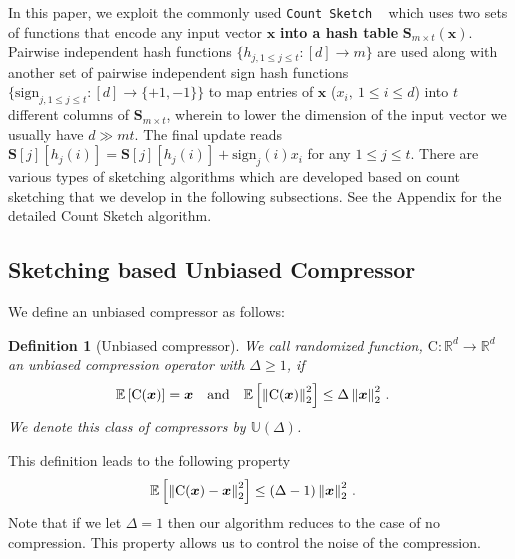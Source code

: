 \documentclass{article} %
\newtheorem{definition}{Definition}
\begin{document}
In this paper, we exploit the commonly used \texttt{Count Sketch} ~\citep{DBLP:journals/tcs/CharikarCF04} which uses two sets of functions that encode any input vector $\boldsymbol{x}$ \textbf{into a hash table} $\boldsymbol{S}_{m\times t}(\boldsymbol{x})$. 
Pairwise independent hash functions $\{h_{j,1\leq j\leq t }:[d]\rightarrow m\}$ are used along with another set of pairwise independent sign hash functions $\{\text{sign}_{j,1\leq j\leq t}: [d]\rightarrow \{+1,-1\}\}$ to map entries of $\boldsymbol{x}$ (${x}_i, \:1\leq i\leq d$) into $t$ different columns of $\mathbf{S}_{m\times t}$, wherein to lower the dimension of the input vector we usually have $d\gg mt$.  
The final update reads $\mathbf{S}[j][h_j(i)]=\mathbf{S}[j][h_{j}(i)]+\text{sign}_j(i){x}_i$ for any $1 \leq j \leq t$. There are various types of sketching algorithms which are developed based on count sketching that we develop in the following subsections. 
See the Appendix for the detailed Count Sketch algorithm. 




\vspace{-0.05in}
\subsection{Sketching based Unbiased Compressor}
\vspace{-0.05in}



We define an unbiased compressor as follows:
\begin{definition}[Unbiased compressor]\label{def:unbiased}
We call randomized function, $\text{C}:\mathbb{R}^{d}\rightarrow\mathbb{R}^{d}$ an unbiased compression operator with $\Delta\geq 1$, if
\begin{align}\notag
\mathbb{E}\left[\text{C}(\boldsymbol{x})\right]&=\boldsymbol{x}\nonumber \quad \textrm{and} \quad    \mathbb{E}\left[\left\|\text{C}(\boldsymbol{x})\right\|^2_2\right] \leq \Delta\left\|\boldsymbol{x}\right\|^2_2\notag \, .
\end{align}
We denote this class of compressors by $\mathbb{U}(\Delta)$.
\end{definition}
This definition leads to the following property 
\begin{align}\notag
    \mathbb{E}\left[\left\|\text{C}(\boldsymbol{x})-\boldsymbol{x}\right\|^2_2\right]&\leq \left(\Delta-1\right)\left\|\boldsymbol{x}\right\|^2_2\, .
\end{align}
Note that if we let $\Delta=1$ then our algorithm reduces to the case of no compression. 
This property allows us to control the noise of the compression.
\end{document}
